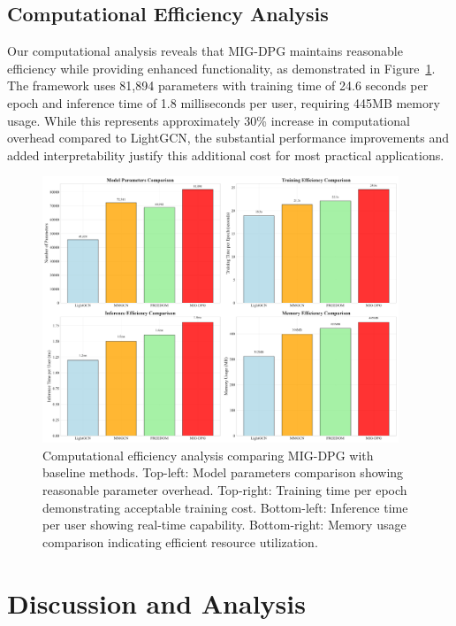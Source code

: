 \documentclass[pdflatex,sn-mathphys-num]{sn-jnl}%
\theoremstyle{thmstyleone}%
\theoremstyle{thmstyletwo}%
\theoremstyle{thmstylethree}%
\begin{document}
\subsection{Computational Efficiency Analysis}

Our computational analysis reveals that MIG-DPG maintains reasonable efficiency while providing enhanced functionality, as demonstrated in Figure~\ref{fig:computational_efficiency}. The framework uses 81,894 parameters with training time of 24.6 seconds per epoch and inference time of 1.8 milliseconds per user, requiring 445MB memory usage. While this represents approximately 30\% increase in computational overhead compared to LightGCN, the substantial performance improvements and added interpretability justify this additional cost for most practical applications.

\begin{figure}[t]
\centering
\includegraphics[width=0.95\textwidth]{figures/computational_efficiency.pdf}
\caption{Computational efficiency analysis comparing MIG-DPG with baseline methods. Top-left: Model parameters comparison showing reasonable parameter overhead. Top-right: Training time per epoch demonstrating acceptable training cost. Bottom-left: Inference time per user showing real-time capability. Bottom-right: Memory usage comparison indicating efficient resource utilization.}
\label{fig:computational_efficiency}
\end{figure}

\section{Discussion and Analysis}\label{sec:discussion}
\end{document}
